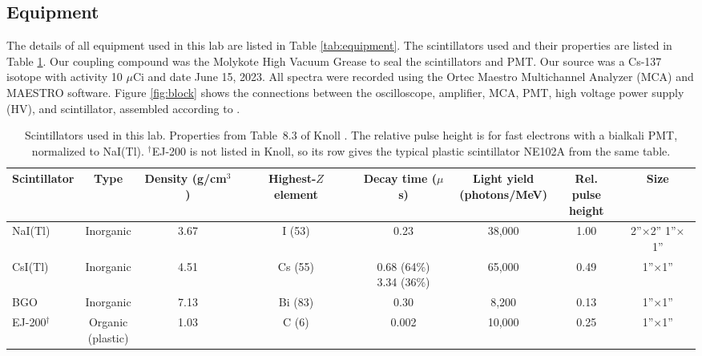 \documentclass[12pt]{article}
\begin{document}
\subsection{Equipment}

The details of all equipment used in this lab are listed in Table \ref{tab:equipment}. The scintillators used and their properties are listed in Table \ref{tab:scintillators}. Our coupling compound was the Molykote High Vacuum Grease to seal the scintillators and PMT. Our source was a Cs-137 isotope with activity 10 $\mu$Ci and date June 15, 2023. All spectra were recorded using the Ortec Maestro Multichannel Analyzer (MCA) and MAESTRO software. Figure \ref{fig:block} shows the connections between the oscilloscope, amplifier, MCA, PMT, high voltage power supply (HV), and scintillator, assembled according to \cite{labmanual}.

\begin{table}[!htbp]
    \centering\footnotesize\setlength{\tabcolsep}{3pt}
    \begin{tabular}{lccccccc}
        \toprule
        \textbf{Scintillator} & \textbf{Type} & \makecell{\textbf{Density}\\(g/cm$^3$)} & \makecell{\textbf{Highest-$Z$}\\\textbf{element}} & \makecell{\textbf{Decay time}\\($\mu$s)} & \makecell{\textbf{Light yield}\\(photons/MeV)} & \makecell{\textbf{Rel. pulse}\\\textbf{height}} & \textbf{Size} \\
        \midrule
        NaI(Tl) & Inorganic & 3.67 & I (53) & 0.23 & 38,000 & 1.00 & \makecell{2''$\times$2''\\1''$\times$1''} \\
        CsI(Tl) & Inorganic & 4.51 & Cs (55) & \makecell{0.68 (64\%)\\3.34 (36\%)} & 65,000 & 0.49 & 1''$\times$1'' \\
        BGO & Inorganic & 7.13 & Bi (83) & 0.30 & 8,200 & 0.13 & 1''$\times$1'' \\
        EJ-200$^{\dagger}$ & \makecell{Organic\\(plastic)} & 1.03 & C (6) & 0.002 & 10,000 & 0.25 & 1''$\times$1'' \\
        \bottomrule
    \end{tabular}
    \caption{Scintillators used in this lab. Properties from Table~8.3 of Knoll \cite{knoll}. The relative pulse height is for fast electrons with a bialkali PMT, normalized to NaI(Tl). $^{\dagger}$EJ-200 is not listed in Knoll, so its row gives the typical plastic scintillator NE102A from the same table.}
    \label{tab:scintillators}
\end{table}
\end{document}
